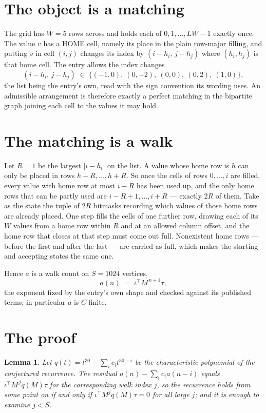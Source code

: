 \documentclass[11pt,a4paper]{article}
\theoremstyle{plain}
\newtheorem{lemma}[theorem]{Lemma}
\theoremstyle{definition}
\begin{document}
\section{The object is a matching}

The grid has $W=5$ rows across and holds each of $0,1,\dots,LW-1$ exactly once. The value
$v$ has a HOME cell, namely its place in the plain row-major filling, and putting $v$ in cell
$(i,j)$ changes its index by $(i-h_i,\,j-h_j)$ where $(h_i,h_j)$ is that home cell. The entry
allows the index changes
\[
(i-h_i,\,j-h_j)\;\in\;\{(-1,0),\ (0,-2),\ (0,0),\ (0,2),\ (1,0)\},
\]
the list being the entry's own, read with the sign convention its wording uses. An admissible
arrangement is therefore exactly a perfect matching in the bipartite graph joining each cell to
the values it may hold.

\section{The matching is a walk}

Let $R=1$ be the largest $|i-h_i|$ on the list. A value whose home row is $h$ can only be
placed in rows $h-R,\dots,h+R$. So once the cells of rows $0,\dots,i$ are filled, every
value with home row at most $i-R$ has been used up, and the only home rows that can be
partly used are $i-R+1,\dots,i+R$ --- exactly $2R$ of them. Take as the state the tuple of
$2R$ bitmasks recording which values of those home rows are already placed. One step fills
the cells of one further row, drawing each of its $W$ values from a home row within $R$
and at an allowed column offset, and the home row that closes at that step must come out
full. Nonexistent home rows --- before the first and after the last --- are carried as
full, which makes the starting and accepting states the same one.

Hence $a$ is a walk count on $S=1024$ vertices,
\[
a(n)\;=\;\iota^{\!\top}M^{\,n+1}\tau ,
\]
the exponent fixed by the entry's own shape and checked against its published terms; in
particular $a$ is $C$-finite.

\section{The proof}

\begin{lemma}\label{lem:crit}
Let $q(t)=t^{30}-\sum_i c_it^{30-i}$ be the characteristic polynomial of the
conjectured recurrence. The residual $a(n)-\sum_ic_ia(n-i)$ equals
$\iota^{\!\top}M^{\,j}q(M)\tau$ for the corresponding walk index $j$, so the recurrence
holds from some point on if and only if $\iota^{\!\top}M^{j}q(M)\tau=0$ for all large $j$;
and it is enough to examine $j<S$.
\end{lemma}
\end{document}
